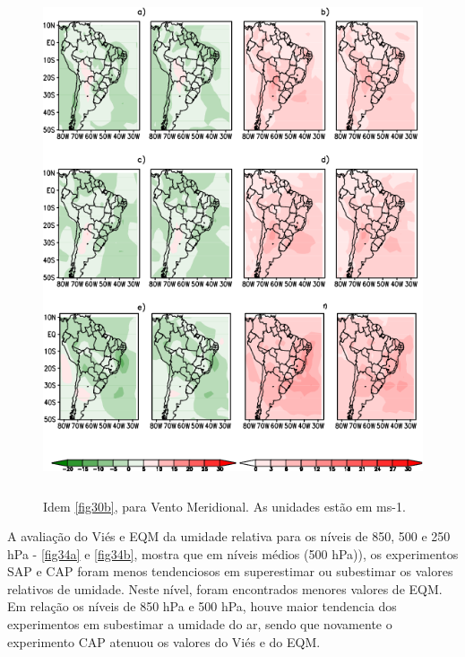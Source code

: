 \begin{figure}[!hbp]
\centering
\includegraphics[height=15cm]{./figs/campo_vies_eqm-vvel.png}
\caption{Idem \autoref{fig30b}, para Vento Meridional. As unidades estão em ms-1.}
\label{fig33b}
\end{figure}

A avaliação do Viés e EQM da umidade relativa para os níveis de 850, 500 e 250 hPa - \autoref{fig34a} e \autoref{fig34b}, mostra que em níveis médios (500 hPa)), os experimentos SAP e CAP foram menos tendenciosos em superestimar ou subestimar os valores relativos de umidade. Neste nível, foram encontrados menores valores de EQM. Em relação os níveis de 850 hPa e 500 hPa, houve maior tendencia dos experimentos em subestimar a umidade do ar, sendo que novamente o experimento CAP atenuou os valores do Viés e do EQM.

